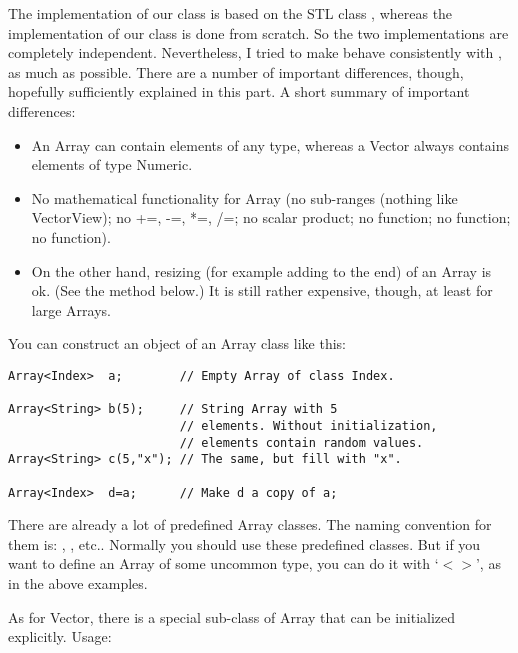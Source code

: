 The implementation of our  class is based on the STL class
, whereas the implementation of our 
class is done from scratch. So the two implementations are completely
independent. Nevertheless, I tried to make  behave
consistently with , as much as possible. There are a number
of important differences, though, hopefully sufficiently explained in
this part. A short summary of important differences:

\begin{itemize}
\item An Array can contain elements of any type, whereas a Vector
  always contains elements of type Numeric.
\item No mathematical functionality for Array (no sub-ranges (nothing
  like VectorView); no +=, -=, *=, /=; no scalar product; no
   function; no  function; no
   function).
\item On the other hand, resizing (for example adding to the end) of
  an Array is ok. (See the  method below.) It is still
  rather expensive, though, at least for large Arrays. 
\end{itemize}

You can construct an object of an Array class like this:

\begin{verbatim}
Array<Index>  a;        // Empty Array of class Index.

Array<String> b(5);     // String Array with 5
                        // elements. Without initialization, 
                        // elements contain random values.
Array<String> c(5,"x"); // The same, but fill with "x".

Array<Index>  d=a;      // Make d a copy of a;
\end{verbatim}

There are already a lot of predefined Array classes. The naming
convention for them is: , ,
etc.. Normally you should use these predefined classes. But if you want
to define an Array of some uncommon type, you can do it with `$<>$',
as in the above examples. 

As for Vector, there is a special sub-class of Array that can be
initialized explicitly. Usage:


